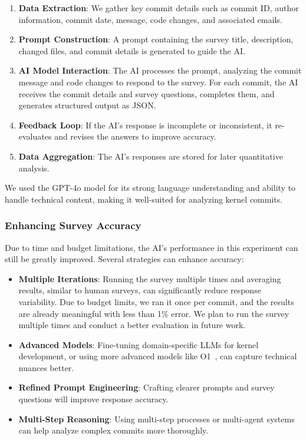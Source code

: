 \begin{enumerate} 
\item \textbf{Data Extraction}: We gather key commit details such as commit ID, author information, commit date, message, code changes, and associated emails.
\item \textbf{Prompt Construction}: A prompt containing the survey title, description, changed files, and commit details is generated to guide the AI.
\item \textbf{AI Model Interaction}: The AI processes the prompt, analyzing the commit message and code changes to respond to the survey. For each commit, the AI receives the commit details and survey questions, completes them, and generates structured output as JSON.
\item \textbf{Feedback Loop}: If the AI's response is incomplete or inconsistent, it re-evaluates and revises the answers to improve accuracy.
\item \textbf{Data Aggregation}: The AI's responses are stored for later quantitative analysis.
\end{enumerate}

We used the GPT-4o model for its strong language understanding and ability to handle technical content, making it well-suited for analyzing kernel commits.

\subsubsection{Enhancing Survey Accuracy}

Due to time and budget limitations, the AI's performance in this experiment can still be greatly improved. Several strategies can enhance accuracy:

\begin{itemize}
\item \textbf{Multiple Iterations}: Running the survey multiple times and averaging results, similar to human surveys, can significantly reduce response variability. Due to budget limits, we ran it once per commit, and the results are already meaningful with less than 1\% error. We plan to run the survey multiple times and conduct a better evaluation in future work.
\item \textbf{Advanced Models}: Fine-tuning domain-specific LLMs for kernel development, or using more advanced models like O1~\cite{o1}, can capture technical nuances better.
\item \textbf{Refined Prompt Engineering}: Crafting clearer prompts and survey questions will improve response accuracy.
\item \textbf{Multi-Step Reasoning}: Using multi-step processes or multi-agent systems can help analyze complex commits more thoroughly.
\end{itemize}

